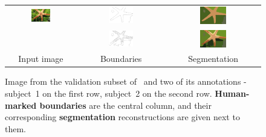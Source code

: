 \begin{figure}[ht!]
\begin{center}
  \begin{tabular}{ c c c }
  \includegraphics[width=0.3\textwidth]{images/examples/starfish/starfish.png} &
  \includegraphics[width=0.3\textwidth,frame]{images/examples/starfish/starfish_bdry_coarse.png} &
  \includegraphics[width=0.3\textwidth]{images/examples/starfish/starfish_segm_coarse.png} \\
  &
  \includegraphics[width=0.3\textwidth,frame]{images/examples/starfish/starfish_bdry_detail.png} &
  \includegraphics[width=0.3\textwidth]{images/examples/starfish/starfish_segm_detail.png} \\
  Input image & Boundaries & Segmentation \\
  \end{tabular}
\end{center}
\caption[BSDS500 dataset - 2 annotations]{Image from the validation subset of~\cite{BSDS500resources} and two of its annotations - subject~1 on the first row, subject~2 on the second row. {\bf Human-marked boundaries} are the central column, and their corresponding {\bf segmentation} reconstructions are given next to them.}
\label{fig:BSDS-annotations}
\end{figure}

